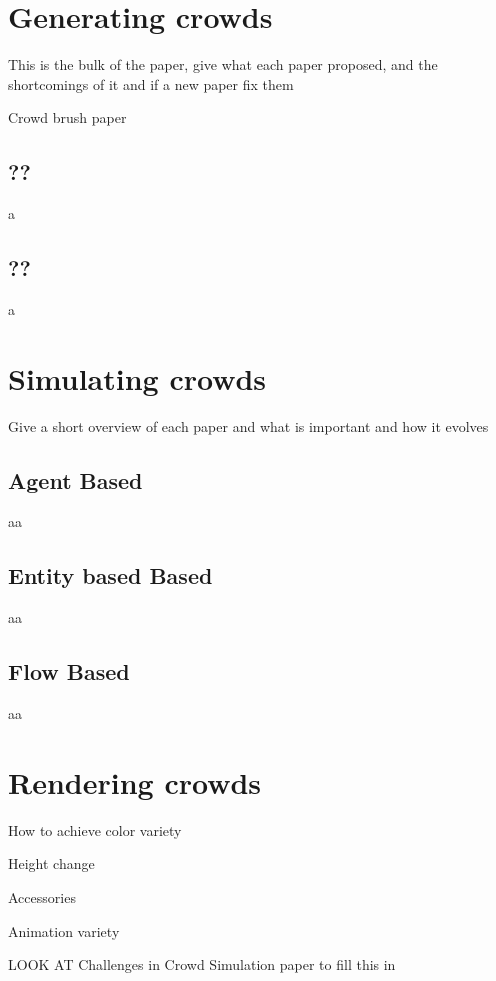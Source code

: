 \documentclass[conference]{acmsiggraph}
\begin{document}
\section{Generating crowds}

This is the bulk of the paper, give what each paper proposed, and the shortcomings
of it and if a new paper fix them
 
Crowd brush paper

\subsection{??}

a

\subsection{??}

a

\section{Simulating crowds}

Give a short overview of each paper and what is important and how it evolves

\subsection{Agent Based}

aa

\subsection{Entity based Based}

aa

\subsection{Flow Based}

aa

\section{Rendering crowds}

How to achieve color variety

Height change

Accessories 

Animation variety

LOOK AT Challenges in Crowd Simulation paper to fill this in
\end{document}
